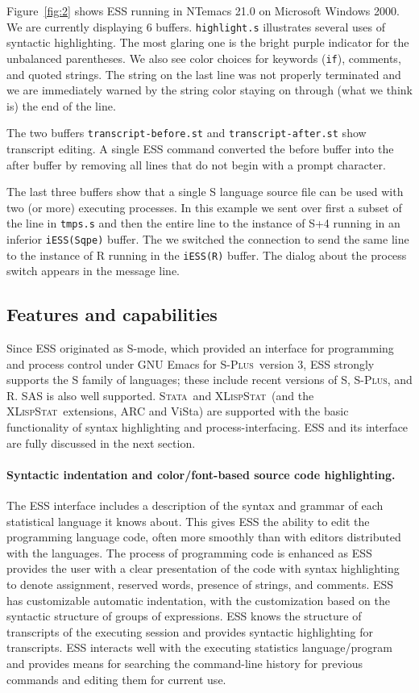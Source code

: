 \documentclass{article}
\newcommand*{\Splus}{\textsc{S-Plus}}
\newcommand*{\XLispStat}{\textsc{XLispStat}}
\newcommand*{\Stata}{\textsc{Stata}}
\newcommand{\stexttt}[1]{{\small\texttt{#1}}}
\begin{document}
Figure~\ref{fig:2} shows ESS running in NTemacs 21.0 on Microsoft
Windows 2000.  We are currently displaying 6 buffers.
\stexttt{highlight.s} illustrates several uses of syntactic
highlighting.  The most glaring one is the bright purple indicator for
the unbalanced parentheses.  We also see color choices for keywords
(\stexttt{if}), comments, and quoted strings.  The string on the last
line was not properly terminated and we are immediately warned by the
string color staying on through (what we think is) the end of the
line.

The two buffers \stexttt{transcript-before.st} and
\stexttt{transcript-after.st} show transcript editing.  A single ESS
command converted the before buffer into the after buffer by removing
all lines that do not begin with a prompt character.

The last three buffers show that a single S language source file can
be used with two (or more) executing processes.  In this example we
sent over first a subset of the line in \stexttt{tmps.s} and then the
entire line to the instance of S+4 running in an inferior
\stexttt{iESS(Sqpe)} buffer.  The we switched the connection to send
the same line to the instance of R running in the \stexttt{iESS(R)}
buffer.  The dialog about the process switch appears in the message line.


\subsection{Features and capabilities}
\label{sec:ESS:features}

Since ESS originated as S-mode, which provided an interface for
programming and process control under GNU Emacs for \Splus\ version 3,
ESS strongly supports the S family of languages; these include recent
versions of S, \Splus, and R.  SAS is also well supported.  \Stata\
and \XLispStat\ (and the \XLispStat\ extensions, ARC and ViSta) are
supported with the basic functionality of syntax highlighting and
process-interfacing.  ESS and its interface are fully discussed in the
next section.

\paragraph{Syntactic indentation and color/font-based source code
  highlighting.}
The ESS interface includes a description of the syntax and grammar of
each statistical language it knows about.  This gives ESS the ability
to edit the programming language code, often more smoothly than with
editors distributed with the languages.  The process of programming
code is enhanced as ESS provides the user with a clear presentation of
the code with syntax highlighting to denote assignment, reserved
words, presence of strings, and comments.  ESS has customizable
automatic indentation, with the customization based on the syntactic
structure of groups of expressions.  ESS knows the structure of
transcripts of the executing session and provides syntactic highlighting
for transcripts.  ESS interacts well with the executing statistics
language/program and
provides means for searching the command-line history for previous
commands and editing them for current use.
\end{document}
